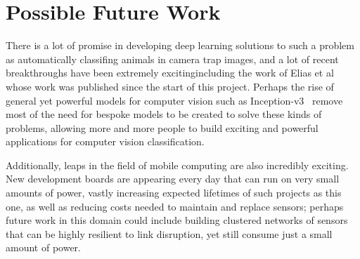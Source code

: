 \section{Possible Future Work}
There is a lot of promise in developing deep learning solutions to such a
problem as automatically classifing animals in camera trap images, and a lot
of recent breakthroughs have been extremely exciting\textemdash{}including
the work of Elias et al~\cite{elias2017s} whose work was published since the
start of this project. Perhaps the rise of general yet powerful models for
computer vision such as Inception-v3~\cite{szegedy2016rethinking} remove most
of the need for bespoke models to be created to solve these kinds of
problems, allowing more and more people to build exciting and powerful
applications for computer vision classification.

Additionally, leaps in the field of mobile computing are also incredibly
exciting. New development boards are appearing every day that can run on very
small amounts of power, vastly increasing expected lifetimes of such projects
as this one, as well as reducing costs needed to maintain and replace
sensors; perhaps future work in this domain could include building clustered
networks of sensors that can be highly resilient to link disruption, yet
still consume just a small amount of power.